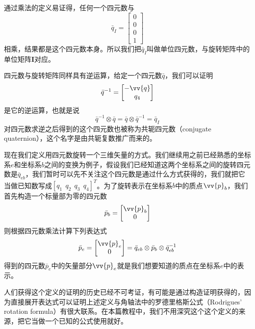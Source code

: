 \documentclass[11pt]{article}
\begin{document}
通过乘法的定义易证得，任何一个四元数与
$$
\bar{q}_I = 
\begin{bmatrix}
0 \\ 0 \\ 0 \\ 1
\end{bmatrix}
$$
相乘，结果都是这个四元数本身。所以我们把$\bar{q}_I$叫做单位四元数，与旋转矩阵中的单位矩阵$\mathbf{I}$对应。

四元数与旋转矩阵同样具有逆运算，给定一个四元数$\bar{q}$，我们可以证明
$$
\bar{q}^{-1} = 
\begin{bmatrix}
                      -\vv{q}\\
                      q_4
\end{bmatrix}
$$
是它的逆运算，也就是说
$$
\bar{q}^{-1} \otimes \bar{q} = \bar{q} \otimes \bar{q}^{-1} = \bar{q}_I
$$
对四元数求逆之后得到的这个四元数也被称为共轭四元数（conjugate quaternion），这个名字是由共轭复数推广而来的。

现在我们定义用四元数旋转一个三维矢量的方式。我们继续用之前已经熟悉的坐标系$e$和坐标系$b$之间的变换为例子，假设我们已经知道这两个坐标系之间的旋转四元数是$\bar{q}_{eb}$，我们暂时可以先不关注这个四元数是通过什么方式获得的，我们就把它当做已知数写成$[q_1 \ \ q_2 \ \ q_3 \ \ q_4]^T$。为了旋转表示在坐标系$b$中的质点$\vv{p}_b$，我们首先构造一个标量部为零的四元数
$$
\bar{p}_b =  
\begin{bmatrix}
                      \vv{p}_b\\
                      0
\end{bmatrix}
$$
则根据四元数乘法计算下列表达式
\begin{equation}\label{eqn:quatrotexp}
\bar{p}_e =  
\begin{bmatrix}
                      \vv{p}_e\\
                      0
\end{bmatrix} = 
\bar{q}_{eb} \otimes \bar{p}_b \otimes \bar{q}^{-1}_{eb}
\end{equation}
得到的四元数$\bar{p}_e$中的矢量部分$\vv{p}_e$就是我们想要知道的质点在坐标系$e$中的表示。

人们获得这个定义的证明的历史已经不可考证，有可能是通过构造证明获得的，因为直接展开表达式可以证明上述定义与角轴法中的罗德里格斯公式（Rodrigues' rotation formula）有很大联系。在本篇教程中，我们不用深究这个这个定义的来源，把它当做一个已知的公式使用就好。
\end{document}
